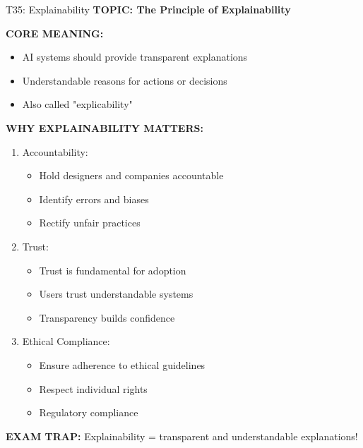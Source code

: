 \documentclass[8pt]{beamer}
\begin{document}
	\begin{frame}{T35: Explainability}
		\fontsize{6.5}{7.5}\selectfont
		\textbf{TOPIC: The Principle of Explainability}
		
		\vspace{0.1cm}
		\textbf{CORE MEANING:}
		\begin{itemize}
			\item AI systems should provide transparent explanations
			\item Understandable reasons for actions or decisions
			\item Also called "explicability"
		\end{itemize}
		
		\vspace{0.1cm}
		\textbf{WHY EXPLAINABILITY MATTERS:}
		\begin{enumerate}
			\item \textcolor{myblue}{Accountability:}
			\begin{itemize}
				\item Hold designers and companies accountable
				\item Identify errors and biases
				\item Rectify unfair practices
			\end{itemize}
			\item \textcolor{myblue}{Trust:}
			\begin{itemize}
				\item Trust is fundamental for adoption
				\item Users trust understandable systems
				\item Transparency builds confidence
			\end{itemize}
			\item \textcolor{myblue}{Ethical Compliance:}
			\begin{itemize}
				\item Ensure adherence to ethical guidelines
				\item Respect individual rights
				\item Regulatory compliance
			\end{itemize}
		\end{enumerate}
		
		\textcolor{myred}{\textbf{EXAM TRAP:}} Explainability = \textcolor{myblue}{transparent and understandable explanations}!
	\end{frame}
	
\end{document}
